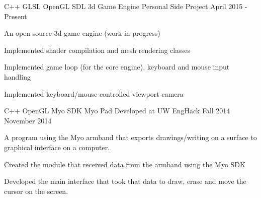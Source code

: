 


\begin{cventries}


\cventry
    {C++ \textbullet{} GLSL \textbullet{} OpenGL \textbullet{} SDL}
{3d Game Engine}
{Personal Side Project}
{April 2015 - Present}
{
An open source 3d game engine (work in progress)   
\begin{cvitems}
\item[]
\item {Implemented shader compilation and mesh rendering classes}
\item {Implemented game loop (for the core engine), keyboard and mouse input handling}
\item {Implemented keyboard/mouse-controlled viewport camera} 
\end{cvitems}
}


\cventry
{C++ \textbullet{} OpenGL \textbullet{} Myo SDK}
{Myo Pad}
{Developed at UW EngHack Fall 2014}
{November 2014}
{
A program using the Myo armband that exports drawings/writing on a surface to graphical interface on a computer.
\begin{cvitems}
\item[]
\item {Created the module that received data from the armband using the Myo SDK}
\item {Developed the main interface that took that data to draw, erase and move the cursor on the screen.}
\end{cvitems}
}



\end{cventries}
